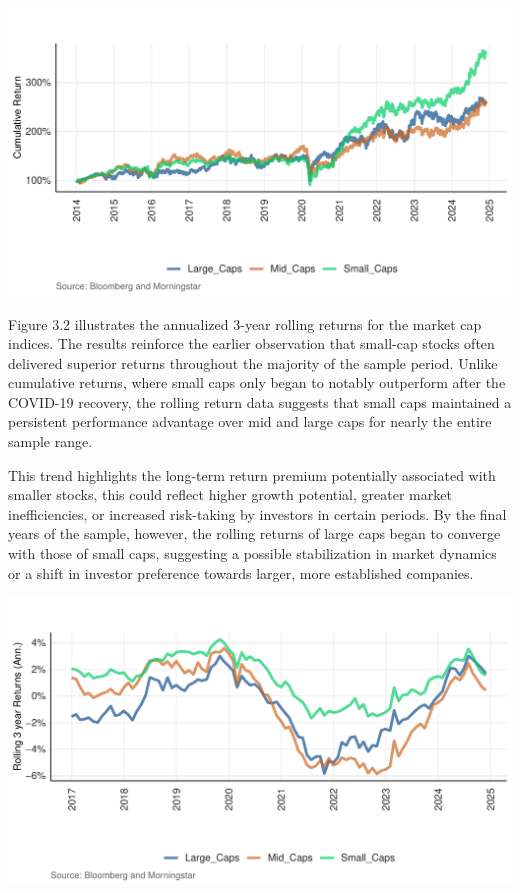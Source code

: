 \documentclass[12pt,preprint]{elsarticle}
\let\origfigure\figure
\let\endorigfigure\endfigure
\renewenvironment{figure}[1][2] {
    \expandafter\origfigure\expandafter[H]
} {
    \endorigfigure
}
\numberwithin{equation}{section}
\numberwithin{figure}{section}
\numberwithin{table}{section}
\begin{document}
\begin{figure}[H]

{\centering \includegraphics{plots/cum_plot} 

}

\caption{Cumulative Returns by Market Cap Size \label{Figure1}}\label{fig:Figure1}
\end{figure}

Figure 3.2 illustrates the annualized 3-year rolling returns for the
market cap indices. The results reinforce the earlier observation that
small-cap stocks often delivered superior returns throughout the
majority of the sample period. Unlike cumulative returns, where small
caps only began to notably outperform after the COVID-19 recovery, the
rolling return data suggests that small caps maintained a persistent
performance advantage over mid and large caps for nearly the entire
sample range.

This trend highlights the long-term return premium potentially
associated with smaller stocks, this could reflect higher growth
potential, greater market inefficiencies, or increased risk-taking by
investors in certain periods. By the final years of the sample, however,
the rolling returns of large caps began to converge with those of small
caps, suggesting a possible stabilization in market dynamics or a shift
in investor preference towards larger, more established companies.

\begin{figure}[H]

{\centering \includegraphics{plots/ret_plot} 

}

\caption{Annualized 3-year Rolling Returns By Market Cap Size \label{Figure2}}\label{fig:Figure2}
\end{figure}
\end{document}
